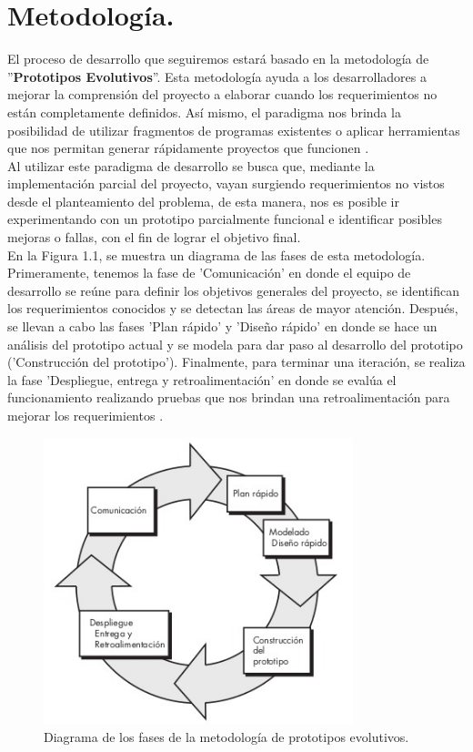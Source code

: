\documentclass[12pt, a4paper, titlepage]{report}
\begin{document}
	    
	\section{Metodolog\'ia.}
		El proceso de desarrollo que seguiremos estará basado en la metodología de ''\textbf{Prototipos Evolutivos}''. Esta metodología ayuda a los desarrolladores a mejorar la comprensión del proyecto a elaborar cuando los requerimientos no están completamente definidos. Así mismo, el paradigma nos brinda la posibilidad de utilizar fragmentos de programas existentes o aplicar herramientas que nos permitan generar rápidamente proyectos que funcionen \cite{Pressman}.\\ 
		Al utilizar este paradigma de desarrollo se busca que, mediante la implementación parcial del proyecto, vayan surgiendo requerimientos no vistos desde el planteamiento del problema, de esta manera, nos es posible ir experimentando con un prototipo parcialmente funcional e identificar posibles mejoras o fallas, con el fin de lograr el objetivo final. \\
		
		En la Figura 1.1, se muestra un diagrama de las fases de esta metodología. Primeramente, tenemos la fase de 'Comunicación' en donde el equipo de desarrollo se reúne para definir los objetivos generales del proyecto, se identifican los requerimientos conocidos y se detectan las áreas de mayor atención. Después, se llevan a cabo las fases 'Plan rápido' y 'Diseño rápido' en donde se hace un análisis del prototipo actual y se modela para dar paso al desarrollo del prototipo ('Construcción del prototipo'). Finalmente, para terminar una iteración, se realiza la fase 'Despliegue, entrega y retroalimentación' en donde se evalúa el funcionamiento realizando pruebas que nos brindan una retroalimentación para mejorar los requerimientos \cite{Pressman}.
		
		 \begin{figure}[H]
			\begin{center}	                      \includegraphics[width=9cm]{./imagenes/Introduccion/Meto_Prototipos.jpeg}
			\caption[Fases de la metodología por prototipos]{Diagrama de los fases de la metodología de prototipos evolutivos.}
			\end{center}
		\end{figure}
	
\end{document}
